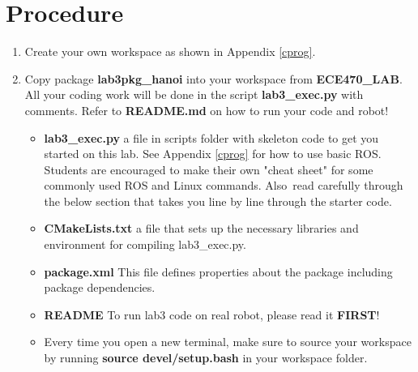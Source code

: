 \section{Procedure}
\begin{enumerate}
\item Create your own workspace as shown in Appendix \ref{cprog}.
\item Copy package \textbf{lab3pkg\_hanoi} into your workspace from \textbf{ECE470\_LAB}. All your coding work will be done in the script \textbf{lab3\_exec.py} with comments. Refer to \textbf{README.md} on how to run your code and robot!

\begin{itemize}
\item \textbf{lab3\_exec.py} a file in scripts folder with skeleton code to get you started on this lab. See Appendix \ref{cprog} for how to use basic ROS. Students are encouraged to make their own "cheat sheet" for some commonly used ROS and Linux commands. Also\
read carefully through the below section that takes you line by line through the starter code.  
\item \textbf{CMakeLists.txt} a file that sets up the necessary libraries and environment for compiling lab3\_exec.py.
\item \textbf{package.xml} This file defines properties about the package including package dependencies.
\item \textbf{README} To run lab3 code on real robot, please read it \textbf{FIRST}!
\item Every time you open a new terminal, make sure to source your workspace by running \textbf{source devel/setup.bash} in your workspace folder.
\end{itemize}


\end{enumerate}
